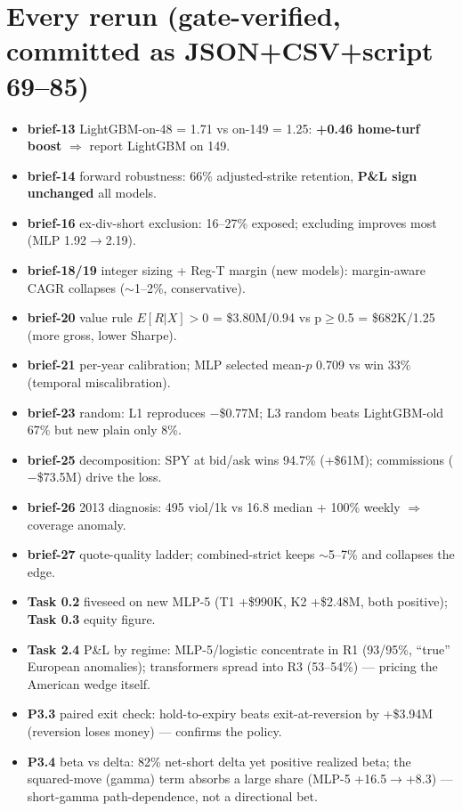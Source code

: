 \documentclass[11pt]{article}
\begin{document}
\section{Every rerun (gate-verified, committed as JSON+CSV+script 69--85)}
\begin{itemize}\itemsep2pt
\item \textbf{brief-13} LightGBM-on-48 = 1.71 vs on-149 = 1.25: \textbf{+0.46 home-turf boost} $\Rightarrow$ report LightGBM on 149.
\item \textbf{brief-14} forward robustness: 66\% adjusted-strike retention, \textbf{P\&L sign unchanged} all models.
\item \textbf{brief-16} ex-div-short exclusion: 16--27\% exposed; excluding improves most (MLP 1.92$\to$2.19).
\item \textbf{brief-18/19} integer sizing + Reg-T margin (new models): margin-aware CAGR collapses ($\sim$1--2\%, conservative).
\item \textbf{brief-20} value rule $E[R|X]{>}0$ = \$3.80M/0.94 vs p$\ge$0.5 = \$682K/1.25 (more gross, lower Sharpe).
\item \textbf{brief-21} per-year calibration; MLP selected mean-$p$ 0.709 vs win 33\% (temporal miscalibration).
\item \textbf{brief-23} random: L1 reproduces $-$\$0.77M; L3 random beats LightGBM-old 67\% but new plain only 8\%.
\item \textbf{brief-25} decomposition: SPY at bid/ask wins 94.7\% (+\$61M); commissions ($-$\$73.5M) drive the loss.
\item \textbf{brief-26} 2013 diagnosis: 495 viol/1k vs 16.8 median + 100\% weekly $\Rightarrow$ coverage anomaly.
\item \textbf{brief-27} quote-quality ladder; combined-strict keeps $\sim$5--7\% and collapses the edge.
\item \textbf{Task 0.2} fiveseed on new MLP-5 (T1 +\$990K, K2 +\$2.48M, both positive); \textbf{Task 0.3} equity figure.
\item \textbf{Task 2.4} P\&L by regime: MLP-5/logistic concentrate in R1 (93/95\%, ``true'' European anomalies);
transformers spread into R3 (53--54\%) --- pricing the American wedge itself.
\item \textbf{P3.3} paired exit check: hold-to-expiry beats exit-at-reversion by +\$3.94M (reversion loses money) --- confirms the policy.
\item \textbf{P3.4} beta vs delta: 82\% net-short delta yet positive realized beta; the squared-move (gamma) term
absorbs a large share (MLP-5 +16.5$\to$+8.3) --- short-gamma path-dependence, not a directional bet.
\end{itemize}
\end{document}
